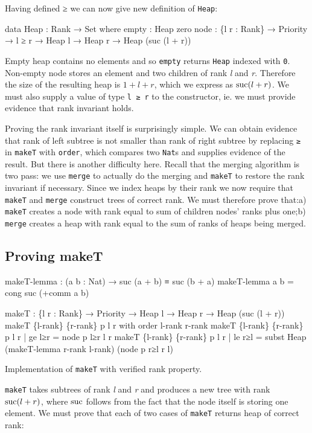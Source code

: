 Having defined ≥ we can now give new definition of \texttt{Heap}:

\begin{code}
data Heap : Rank → Set where
  empty : Heap zero
  node  : \{l r : Rank\} → Priority → l ≥ r →
          Heap l → Heap r → Heap (suc (l + r))
\end{code}

\noindent
Empty heap contains no elements and so \texttt{empty} returns \texttt{Heap} indexed with \texttt{0}. Non-empty node stores an element and two children of rank \textit{l} and \textit{r}. Therefore the size of the resulting heap is $1 + l + r$, which we express as $\operatorname{suc}(l + r)$. We must also supply a value of type \texttt{l ≥ r} to the constructor, ie. we must provide evidence that rank invariant holds.

Proving the rank invariant itself is surprisingly simple. We can obtain evidence that rank of left subtree is not smaller than rank of right subtree by replacing \texttt{≥} in \texttt{makeT} with \texttt{order}, which compares two \texttt{Nat}s and supplies evidence of the result. But there is another difficulty here. Recall that the merging algorithm is two pass: we use \texttt{merge} to actually do the merging and \texttt{makeT} to restore the rank invariant if necessary. Since we index heaps by their rank we now require that \texttt{makeT} and \texttt{merge} construct trees of correct rank. We must therefore prove that:\linebreak a) \texttt{makeT} creates a node with rank equal to sum of children nodes' ranks plus one;\linebreak b) \texttt{merge} creates a heap with rank equal to the sum of ranks of heaps being merged.

\subsection{Proving makeT}\label{sec:twopass-makeT-proof}

\begin{listing}[b!]
\begin{code}
makeT-lemma : (a b : Nat) → suc (a + b) ≡ suc (b + a)
makeT-lemma a b = cong suc (+comm a b)

makeT : \{l r : Rank\} → Priority → Heap l → Heap r → Heap (suc (l + r))
makeT \{l-rank\} \{r-rank\} p l r with order l-rank r-rank
makeT \{l-rank\} \{r-rank\} p l r | ge l≥r
  = node p l≥r l r
makeT \{l-rank\} \{r-rank\} p l r | le r≥l
  = subst Heap (makeT-lemma r-rank l-rank) (node p r≥l r l)
\end{code}
\caption{Implementation of \texttt{makeT} with verified rank property.}\label{lst:rank-proof-makeT-two-pass}
\end{listing}
\noindent
\texttt{makeT} takes subtrees of rank \textit{l} and \textit{r} and produces a new tree with rank $\operatorname{suc}(l + r)$, where $\operatorname{suc}$ follows from the fact that the node itself is storing one element. We must prove that each of two cases of \texttt{makeT} returns heap of correct rank:

